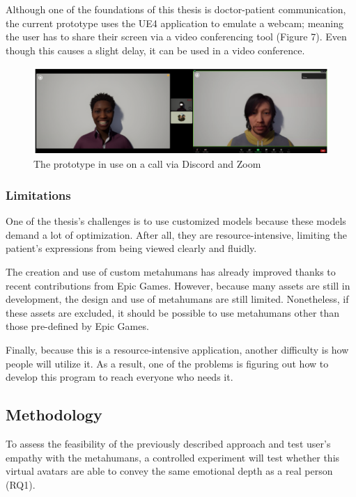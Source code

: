 Although one of the foundations of this thesis is doctor-patient communication, the current prototype uses the UE4 application to emulate a webcam; meaning the user has to share their screen via a video conferencing tool (Figure 7). Even though this causes a slight delay, it can be used in a video conference.

\begin{figure}[h!]
\includegraphics[width=\textwidth]{figures/zoomAndDiscord.PNG}
\centering
\caption{The prototype in use on a call via Discord and Zoom}
\end{figure}

\subsubsection{Limitations}
One of the thesis's challenges is to use customized models because these models demand a lot of optimization. After all, they are resource-intensive, limiting the patient's expressions from being viewed clearly and fluidly. 

The creation and use of custom metahumans has already improved thanks to recent contributions from Epic Games. However, because many assets are still in development, the design and use of metahumans are still limited.  Nonetheless, if these assets are excluded, it should be possible to use metahumans other than those pre-defined by Epic Games.

Finally, because this is a resource-intensive application, another difficulty is how people will utilize it. As a result, one of the problems is figuring out how to develop this program to reach everyone who needs it.

\subsection{Methodology}
To assess the feasibility of the previously described approach and test user's empathy with the metahumans, a controlled experiment will test whether this virtual avatars are able to convey the same emotional depth as a real person (RQ1).

